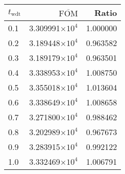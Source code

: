 \begin{tabular}{lrr}
\toprule
$t_{\mathrm{wdt}}$ & $\overline{\mathrm{FOM}}$ &    Ratio \\
\midrule
               0.1 &   3.309991$\times 10^{4}$ & 1.000000 \\
               0.2 &   3.189448$\times 10^{4}$ & 0.963582 \\
               0.3 &   3.189179$\times 10^{4}$ & 0.963501 \\
               0.4 &   3.338953$\times 10^{4}$ & 1.008750 \\
               0.5 &   3.355018$\times 10^{4}$ & 1.013604 \\
               0.6 &   3.338649$\times 10^{4}$ & 1.008658 \\
               0.7 &   3.271800$\times 10^{4}$ & 0.988462 \\
               0.8 &   3.202989$\times 10^{4}$ & 0.967673 \\
               0.9 &   3.283915$\times 10^{4}$ & 0.992122 \\
               1.0 &   3.332469$\times 10^{4}$ & 1.006791 \\
\bottomrule
\end{tabular}
